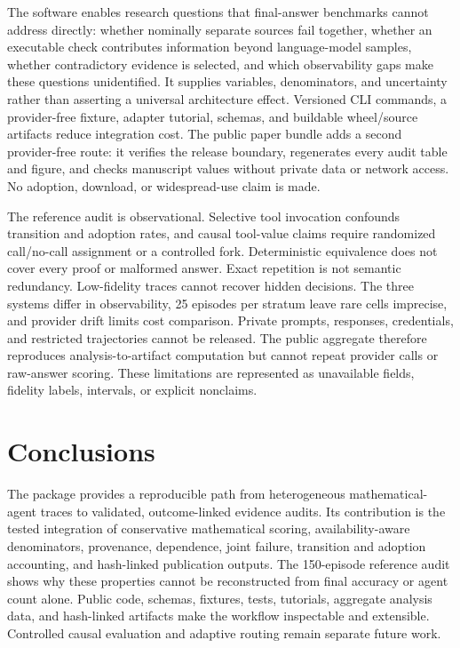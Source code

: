 \documentclass[preprint,12pt,a4paper]{elsarticle}
\begin{document}
The software enables research questions that final-answer benchmarks cannot
address directly: whether nominally separate sources fail together, whether an
executable check contributes information beyond language-model samples,
whether contradictory evidence is selected, and which observability gaps make
these questions unidentified. It supplies variables, denominators, and
uncertainty rather than asserting a universal architecture effect. Versioned
CLI commands, a provider-free fixture, adapter tutorial, schemas, and buildable
wheel/source artifacts reduce integration cost. The public paper bundle adds a
second provider-free route: it verifies the release boundary, regenerates every
audit table and figure, and checks manuscript values without private data or
network access. No adoption, download, or widespread-use claim is made.

The reference audit is observational. Selective tool invocation confounds
transition and adoption rates, and causal tool-value claims require randomized
call/no-call assignment or a controlled fork. Deterministic equivalence does not
cover every proof or malformed answer. Exact repetition is not semantic
redundancy. Low-fidelity traces cannot recover hidden
decisions. The three systems differ in observability, 25 episodes per stratum
leave rare cells imprecise, and provider drift limits cost comparison. Private
prompts, responses, credentials, and restricted trajectories cannot be released.
The public aggregate therefore reproduces analysis-to-artifact computation but
cannot repeat provider calls or raw-answer scoring. These limitations are
represented as unavailable fields, fidelity labels, intervals, or explicit
nonclaims.

\section{Conclusions}
\label{sec:conclusions}

The package provides a reproducible path from heterogeneous mathematical-
agent traces to validated, outcome-linked evidence audits. Its contribution is
the tested integration of conservative mathematical scoring, availability-aware
denominators, provenance, dependence, joint failure, transition and adoption
accounting, and hash-linked publication outputs. The 150-episode reference audit
shows why these properties cannot be reconstructed from final accuracy or agent
count alone. Public code, schemas, fixtures, tests, tutorials, aggregate analysis
data, and hash-linked artifacts make the workflow inspectable and extensible. Controlled
causal evaluation and adaptive routing remain separate future work.
\end{document}

